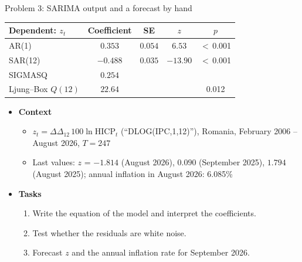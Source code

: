 \begin{frame}{Problem 3: SARIMA output and a forecast by hand}
\itemsize{\footnotesize}
\begin{center}
\scriptsize
\begin{tabular}{lcccc}
\toprule
\textbf{Dependent: $z_t$} & Coefficient & SE & $z$ & $p$ \\
\midrule
AR(1) & $0.353$ & $0.054$ & $6.53$ & $<$\,0.001 \\
SAR(12) & $\ensuremath{-}0.488$ & $0.035$ & $\ensuremath{-}13.90$ & $<$\,0.001 \\
SIGMASQ & $0.254$ & & & \\
Ljung--Box $Q(12)$ & $22.64$ & & & 0.012 \\
\bottomrule
\end{tabular}
\end{center}
\begin{itemize}
    \item \textbf{Context}
    \begin{itemize}
        \item $z_t = \Delta\Delta_{12}\,100\ln \mathrm{HICP}_t$ (``DLOG(IPC,1,12)''), Romania, February 2006 -- August 2026, $T = 247$
        \item Last values: $z$ = $\ensuremath{-}1.814$ (August 2026), $0.090$ (September 2025), $1.794$ (August 2025); annual inflation in August 2026: 6.085\%
    \end{itemize}
    \item \textbf{Tasks}
\begin{enumerate}
    \item Write the equation of the model and interpret the coefficients.
    \item Test whether the residuals are white noise.
    \item Forecast $z$ and the annual inflation rate for September 2026.
\end{enumerate}
\end{itemize}
\end{frame}

